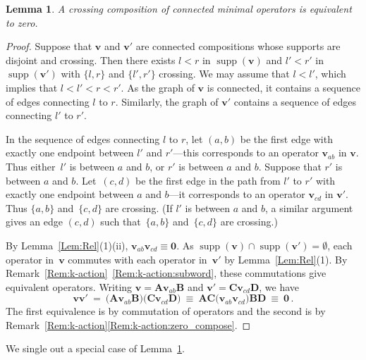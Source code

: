 \documentclass[11pt]{article}
\newtheorem{lemma}[theo]{Lemma}
\theoremstyle{definition}
\numberwithin{equation}{section}
\newcommand{\qv}{{\mathbf v}}
\newcommand{\bzero}{{\mathbf 0}}
\DeclareMathOperator{\supp}{supp}
\begin{document}
\begin{lemma}
    \label{L:crossing-supports}
    A crossing composition of connected minimal operators is equivalent to zero.
\end{lemma}

\begin{proof}
  Suppose that $\qv$ and $\qv'$ are connected compositions whose supports are disjoint and crossing.
  Then there exists $l<r$ in $\supp(\qv)$ and $l'<r'$ in $\supp(\qv')$ with
  $\{l,r\}$ and $\{l',r'\}$ crossing.
  We may assume that $l < l'$, which implies that  $l < l' < r < r'$.
  As the graph of $\qv$ is connected, it contains a sequence of edges connecting $l$ to $r$.
  Similarly, the graph of $\qv'$  contains a sequence of edges connecting $l'$ to $r'$.

  In the sequence of edges connecting $l$ to $r$, let $(a,b)$ be the first edge with exactly one endpoint between $l'$ and $r'$---this
  corresponds to an operator $\qv_{ab}$ in $\qv$.
  Thus either~$l'$ is between $a$ and $b$, or $r'$  is between $a$ and $b$.
  Suppose that $r'$ is between $a$ and $b$.
  Let~$(c,d)$ be the first edge in the path from $l'$ to $r'$ with exactly one endpoint between $a$ and $b$---it corresponds to an operator
  $\qv_{cd}$ in $\qv'$.
  Thus $\{a,b\}$ and~$\{c,d\}$ are crossing.
  (If  $l'$ is between $a$ and $b$, a similar argument gives an edge $(c,d)$ such that~$\{a,b\}$ and~$\{c,d\}$ are crossing.)
  
   By Lemma~\ref{Lem:Rel}(1)(ii), $\qv_{ab} \qv_{cd} \equiv\bzero$.
   As $\supp(\qv)\cap \supp(\qv')=\emptyset$, each operator in~$\qv$ commutes with each operator in~$\qv'$ by
   Lemma~\ref{Lem:Rel}(1).
   By Remark~\ref{Rem:k-action}~\ref{Rem:k-action:subword}, these commutations give equivalent operators.
   Writing $\qv=\mathbf{A} \qv_{ab} \mathbf{B}$ and $\qv'=\mathbf{C}  \qv_{cd}  \mathbf{D}$, we have
    \begin{equation*}
        \qv \qv'
        \ =\  \big(\mathbf{A} \qv_{ab} \mathbf{B}
          \big)
          \big(\mathbf{C}  \qv_{cd}  \mathbf{D}
          \big)
       \  \equiv\  \mathbf{AC} \big(\qv_{ab} \qv_{cd}\big)\mathbf{BD}\  \equiv\  \bzero\,.
    \end{equation*}
   The first equivalence is by commutation of operators and the second is by Remark~\ref{Rem:k-action}\ref{Rem:k-action:zero_compose}.
\end{proof}

We single out a special case of Lemma~\ref{L:crossing-supports}.
\end{document}

